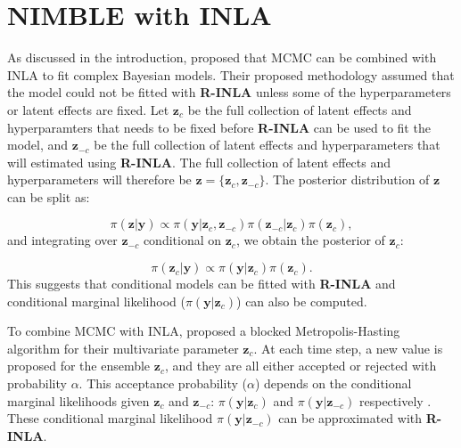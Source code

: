 \documentclass[
]{article}
\begin{document}
\hypertarget{nimble-with-inla}{%
\section{\texorpdfstring{NIMBLE with INLA
\label{inlamcmc}}{NIMBLE with INLA }}\label{nimble-with-inla}}

As discussed in the introduction, \citet{gomez2018markov} proposed that
MCMC can be combined with INLA to fit complex Bayesian models. Their
proposed methodology assumed that the model could not be fitted with
\textbf{R-INLA} unless some of the hyperparameters or latent effects are
fixed. Let \(\mathbf{z}_{c}\) be the full collection of latent effects
and hyperparamters that needs to be fixed before \textbf{R-INLA} can be
used to fit the model, and \(\mathbf{z}_{-c}\) be the full collection of
latent effects and hyperparameters that will estimated using
\textbf{R-INLA}. The full collection of latent effects and
hyperparameters will therefore be
\(\mathbf{z} = \{\mathbf{z}_{c}, \mathbf{z}_{-c} \}\). The posterior
distribution of \(\mathbf{z}\) can be split as:

\begin{equation}\label{posteriorsplit}
\pi(\mathbf{z}|\mathbf{y}) \propto \pi(\mathbf{y}| \mathbf{z}_{c}, \mathbf{z}_{-c}) \pi(\mathbf{z}_{-c}| \mathbf{z}_{c}) \pi(\mathbf{z}_{c}),
\end{equation} and integrating over \(\mathbf{z}_{-c}\) conditional on
\(\mathbf{z}_{c}\), we obtain the posterior of \(\mathbf{z}_{c}\):

\begin{equation}\label{posteriorzc}
\pi(\mathbf{z}_c|\mathbf{y}) \propto \pi(\mathbf{y}| \mathbf{z}_{c}) \pi(\mathbf{z}_{c}).
\end{equation} This suggests that conditional models can be fitted with
\textbf{R-INLA} and conditional marginal likelihood
(\(\pi(\mathbf{y}| \mathbf{z}_{c})\)) can also be computed.

To combine MCMC with INLA, \citet{gomez2018markov} proposed a blocked
Metropolis-Hasting algorithm for their multivariate parameter
\(\mathbf{z}_{c}\). At each time step, a new value is proposed for the
ensemble \(\mathbf{z}_{c}\), and they are all either accepted or
rejected with probability \(\alpha\). This acceptance probability
(\(\alpha\)) depends on the conditional marginal likelihoods given
\(\mathbf{z}_{c}\) and \(\mathbf{z}_{-c}\):
\(\pi(\mathbf{y}| \mathbf{z}_{c})\) and
\(\pi(\mathbf{y}| \mathbf{z}_{-c})\) respectively
\citep{gomez2018markov}. These conditional marginal likelihood
\(\pi(\mathbf{y}| \mathbf{z}_{-c})\) can be approximated with
\textbf{R-INLA}.
\end{document}
